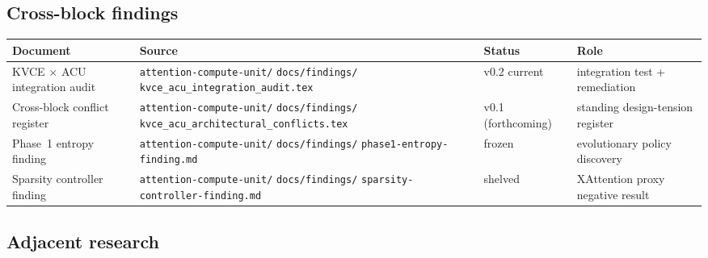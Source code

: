\documentclass[11pt]{article}
\begin{document}
\subsection{Cross-block findings}

\begin{center}
\renewcommand{\arraystretch}{1.2}
\setlength{\tabcolsep}{4pt}
\begin{tabular}{@{}p{}p{}lp{}@{}}
\toprule
\textbf{Document} & \textbf{Source} & \textbf{Status} & \textbf{Role} \\
\midrule
KVCE $\times$ ACU integration audit & \texttt{attention-compute-unit/}
                                  \texttt{docs/findings/}
                                  \texttt{kvce\_acu\_integration\_audit.tex}
  & v0.2 current & integration test + remediation \\
Cross-block conflict register      & \texttt{attention-compute-unit/}
                                  \texttt{docs/findings/}
                                  \texttt{kvce\_acu\_architectural\_conflicts.tex}
  & v0.1 (forthcoming) & standing design-tension register \\
Phase~1 entropy finding            & \texttt{attention-compute-unit/}
                                  \texttt{docs/findings/}
                                  \texttt{phase1-entropy-finding.md}
  & frozen & evolutionary policy discovery \\
Sparsity controller finding        & \texttt{attention-compute-unit/}
                                  \texttt{docs/findings/}
                                  \texttt{sparsity-controller-finding.md}
  & shelved & XAttention proxy negative result \\
\bottomrule
\end{tabular}
\end{center}

\subsection{Adjacent research}
\end{document}
